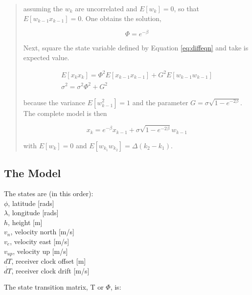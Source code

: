 \documentclass[11pt,letterpaper]{article}
\begin{document}
\begin{quote}
assuming the $w_k$ are uncorrelated and $E[w_k]=0$, so that $E[ w_{k-1} x_{k-1} ] = 0$. One obtains the solution,

\begin{equation} \label{eq:soln}
\Phi = e^{-\beta}
\end{equation}

Next, square the state variable defined by Equation \ref{eq:diffeqn} and take is expected value.

\begin{equation} \label{eq:sqrstate}
\begin{array}{l}
E[x_k x_k] = \Phi^2 E[x_{k-1} x_{k-1}] + G^2 E[ w_{k-1} w_{k-1} ] \\
\sigma^2 = \sigma^2 \Phi^2 + G^2
\end{array}
\end{equation}

because the variance $E[w_{k-1}^2]=1$ and the parameter $G = \sigma \sqrt{1-e^{-2\beta}}$. The complete model is then

\begin{equation} \label{eq:completemodel}
x_k = e^{-\beta} x_{k-1} + \sigma \sqrt{1-e^{-2\beta}} w_{k-1}
\end{equation}

with $E[w_k]=0$ and $E[w_{k_1} w_{k_2}]=\Delta(k_2-k_1)$.

\end{quote}


\subsection{The Model}

The states are (in this order): \\
$\phi$, latitude [rads] \\
$\lambda$, longitude [rads] \\
$h$, height [m] \\
$v_n$, velocity north [m/s] \\
$v_e$, velocity east [m/s] \\
$v_{up}$, velocity up [m/s] \\
$dT$, receiver clock offset [m] \\
$\dot{dT}$, receiver clock drift [m/s]

The state transition matrix, T or $\Phi$, is:
\end{document}
